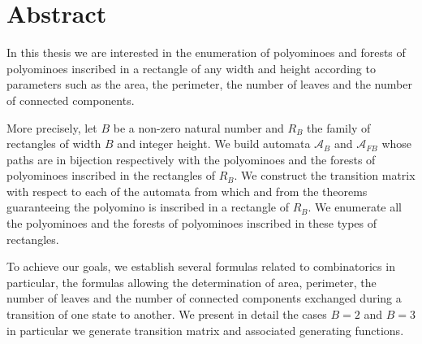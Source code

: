 \chapter*{Abstract}
In this thesis we are interested in the enumeration of polyominoes and forests of polyominoes inscribed in a rectangle of any width and height according to parameters such as the area, the perimeter, the number of leaves and the number of connected components.

 More precisely, let $B$ be a non-zero natural number and $R_{B}$ the family of rectangles of width $B$ and  integer height. We build automata $\mathcal{A}_{B}$ and $\mathcal{A}_{FB}$ whose paths are in bijection respectively with the polyominoes and the forests of polyominoes inscribed in the rectangles of $R_{ B}$. We construct the transition matrix with respect to each of the automata from which and from the theorems guaranteeing the polyomino is inscribed in a rectangle of $R_{B}$. We enumerate all the polyominoes and the forests of polyominoes inscribed in these types of rectangles. 
 
 To achieve our goals, we establish several formulas related to combinatorics in particular, the formulas allowing the determination of area, perimeter, the number of leaves and the number of connected components exchanged during a transition of one state to another. We present in detail the cases $B=2$ and $B=3$ in particular we generate transition matrix and associated  generating functions.